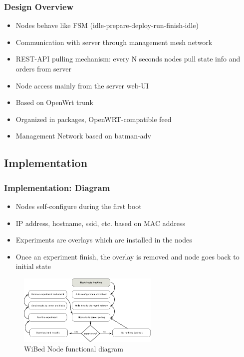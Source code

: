 \documentclass[usepdftitle=false,13pt]{beamer}
\begin{document}
\begin{frame}\frametitle{Design Overview}

	\begin{itemize}
		\item Nodes behave like FSM (idle-prepare-deploy-run-finish-idle)
		\item Communication with server through management mesh network
		\item REST-API pulling mechanism: every N seconds nodes pull state info and orders from server
		\item Node access mainly from the server web-UI
		\item Based on OpenWrt trunk
		\item Organized in packages, OpenWRT-compatible feed
		\item Management Network based on batman-adv 
	\end{itemize}
\end{frame}


\subsection{Implementation}

\begin{frame}\frametitle{Implementation: Diagram}

	\begin{itemize}
	\item Nodes self-configure during the first boot
	\item IP address, hostname, ssid, etc. based on MAC address
	\item Experiments are overlays which are installed in the nodes
	\item Once an experiment finish, the overlay is removed and node goes back to initial state
	\end{itemize}

	\begin{figure}[h!]
	\begin{center}
	\includegraphics[width=0.6\textwidth]{pic/functdia}
	  \caption{WiBed Node functional diagram}
	\label{fig:funct}
	\end{center}
	\end{figure}
\end{frame}
\end{document}
